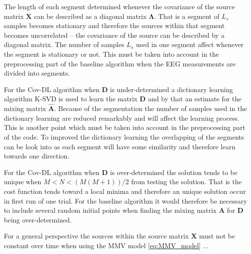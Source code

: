 The length of each segment determined whenever the covariance of the source matrix $\mathbf{X}$ can be described as a diagonal matrix $\boldsymbol{\Lambda}$. That is a segment of $L_s$ samples becomes stationary and therefore the sources within that segment becomes uncorrelated -- the covariance of the source can be described by a diagonal matrix. The number of samples $L_s$ used in one segment affect whenever the segment is stationary or not. This must be taken into account in the preprocessing part of the baseline algorithm when the EEG measurements are divided into segments.

For the Cov-DL algorithm when $\mathbf{D}$ is under-determined a dictionary learning algorithm K-SVD is used to learn the matrix $\mathbf{D}$ and by that an estimate for the mixing matrix $\hat{\mathbf{A}}$. Because of the segmentation the number of samples used in the dictionary learning are reduced remarkably and will affect the learning process. This is another point which must be taken into account in the preprocessing part of the code. To improved the dictionary learning the overlapping of the segments can be look into as each segment will have some similarity and therefore learn towards one direction.

For the Cov-DL algorithm when $\mathbf{D}$ is over-determined the solution tends to be unique when $M < N < (M(M+1))/2$ from testing the solution. That is the cost function tends toward a local minima and therefore an unique solution occur in first run of one trial. For the baseline algorithm it would therefore be necessary to include several random initial points when finding the mixing matrix $\mathbf{A}$ for $\mathbf{D}$ being over-determined.

For a general perspective the sources within the source matrix $\mathbf{X}$ must not be constant over time when using the MMV model \eqref{eq:MMV_model} ...
